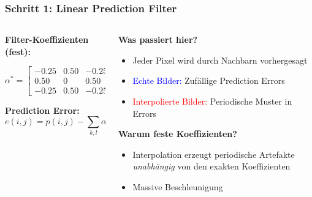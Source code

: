\documentclass[11pt,t,usepdftitle=false,aspectratio=169]{beamer}
\begin{document}
\begin{frame}
	\frametitle{Schritt 1: Linear Prediction Filter}
	
	\begin{columns}[T]
		\begin{column}{0.45\textwidth}
			\textbf{Filter-Koeffizienten (fest):}
			\vspace{0.5em}
			
			$$\alpha^* = \begin{bmatrix} 
			-0.25 & 0.50 & -0.25 \\
			0.50 & 0 & 0.50 \\
			-0.25 & 0.50 & -0.25
			\end{bmatrix}$$
			
			\vspace{0.5em}
			\textbf{Prediction Error:}
			$$e(i,j) = p(i,j) - \sum_{k,l} \alpha^*_{k,l} \cdot p(i+k,j+l)$$
		\end{column}
		\begin{column}{0.5\textwidth}
			\textbf{Was passiert hier?}
			\begin{itemize}
				\item Jeder Pixel wird durch Nachbarn vorhergesagt
				\item \textcolor{blue}{Echte Bilder:} Zufällige Prediction Errors
				\item \textcolor{red}{Interpolierte Bilder:} Periodische Muster in Errors
			\end{itemize}
			
			\vspace{0.5em}
			\textbf{Warum feste Koeffizienten?}
			\begin{itemize}
				\item Interpolation erzeugt periodische Artefakte \textit{unabhängig} von den exakten Koeffizienten
				\item Massive Beschleunigung
			\end{itemize}
		\end{column}
	\end{columns}
\end{frame}
\end{document}
